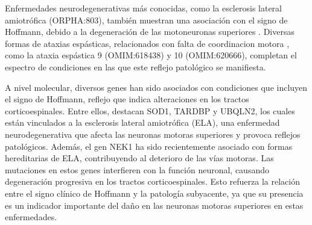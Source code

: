 Enfermedades neurodegenerativas más conocidas, como la esclerosis lateral amiotrófica (ORPHA:803), también muestran una asociación con el signo de Hoffmann, debido a la degeneración de las motoneuronas superiores \cite{RIANCHO201927}. Diversas formas de ataxias espásticas, relacionados con falta de coordinacion motora \cite{Pedroso2022}, como la ataxia espástica 9 (OMIM:618438) y 10 (OMIM:620666), completan el espectro de condiciones en las que este reflejo patológico se manifiesta.

A nivel molecular, diversos genes han sido asociados con condiciones que incluyen el signo de Hoffmann, reflejo que indica alteraciones en los tractos corticoespinales. Entre ellos, destacan SOD1, TARDBP y UBQLN2, los cuales están vinculados a la esclerosis lateral amiotrófica (ELA), una enfermedad neurodegenerativa que afecta las neuronas motoras superiores y provoca reflejos patológicos. Además, el gen NEK1 ha sido recientemente asociado con formas hereditarias de ELA, contribuyendo al deterioro de las vías motoras. Las mutaciones en estos genes interfieren con la función neuronal, causando degeneración progresiva en los tractos corticoespinales. Esto refuerza la relación entre el signo clínico de Hoffmann y la patología subyacente, ya que su presencia es un indicador importante del daño en las neuronas motoras superiores en estas enfermedades.